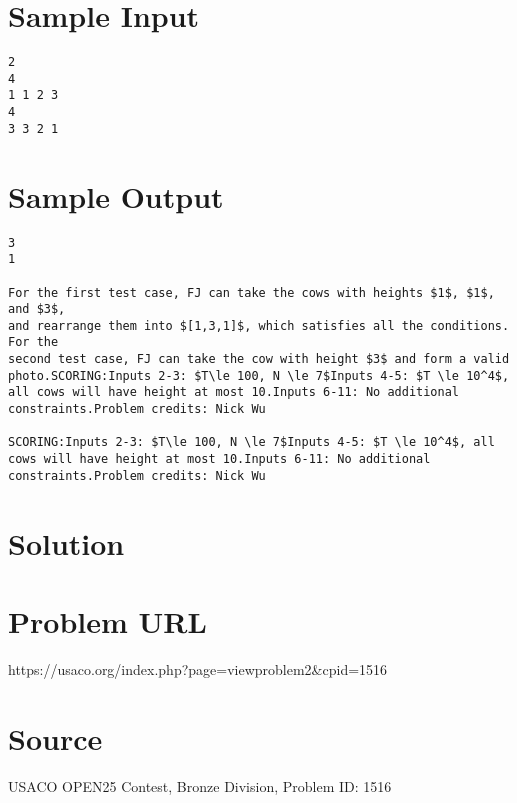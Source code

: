 \documentclass[12pt]{article}
\begin{document}
\section*{Sample Input}
\begin{verbatim}
2
4
1 1 2 3
4
3 3 2 1
\end{verbatim}

\section*{Sample Output}
\begin{verbatim}
3
1

For the first test case, FJ can take the cows with heights $1$, $1$, and $3$,
and rearrange them into $[1,3,1]$, which satisfies all the conditions. For the
second test case, FJ can take the cow with height $3$ and form a valid photo.SCORING:Inputs 2-3: $T\le 100, N \le 7$Inputs 4-5: $T \le 10^4$, all cows will have height at most 10.Inputs 6-11: No additional constraints.Problem credits: Nick Wu

SCORING:Inputs 2-3: $T\le 100, N \le 7$Inputs 4-5: $T \le 10^4$, all cows will have height at most 10.Inputs 6-11: No additional constraints.Problem credits: Nick Wu
\end{verbatim}

\section*{Solution}


\section*{Problem URL}
https://usaco.org/index.php?page=viewproblem2&cpid=1516

\section*{Source}
USACO OPEN25 Contest, Bronze Division, Problem ID: 1516
\end{document}
